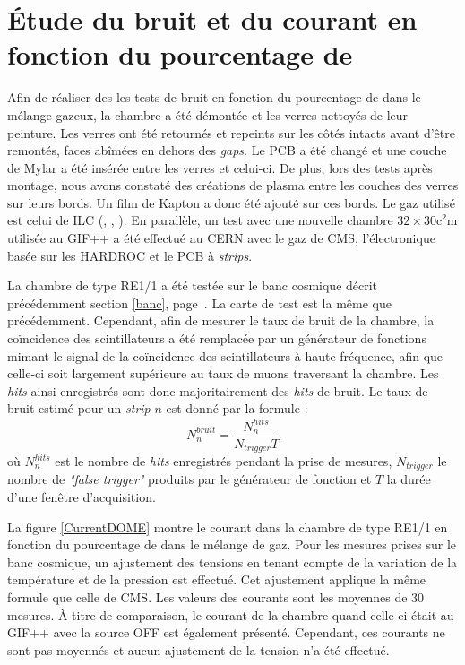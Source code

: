  \section{Étude du bruit et du courant en fonction du pourcentage de \texorpdfstring{}{SF6}}
 \label{SF66}
 Afin de réaliser des les tests de bruit en fonction du pourcentage de  dans le mélange gazeux, la chambre a été démontée et les verres nettoyés de leur peinture. Les verres ont été retournés et repeints sur les côtés intacts avant d'être remontés, faces abîmées en dehors des \textit{gaps}. Le PCB a été changé et une couche de Mylar a été insérée entre les verres et celui-ci. De plus, lors des tests après montage, nous avons constaté des créations de plasma entre les couches des verres sur leurs bords. Un film de Kapton a donc été ajouté sur ces bords. Le gaz utilisé est celui de ILC (, , ). En parallèle, un test avec une nouvelle chambre $\num{32}\times\num{30} \si{\square\centi\meter}$ utilisée au GIF++ a été effectué au CERN avec le gaz de CMS, l'électronique basée sur les HARDROC et le PCB à \textit{strips}.
 
 La chambre de type RE1/1 a été testée sur le banc cosmique décrit précédemment section \ref{banc}, page~\pageref{banc}. La carte de test est la même que précédemment. Cependant, afin de mesurer le taux de bruit de la chambre, la coïncidence des scintillateurs a été remplacée par un générateur de fonctions mimant le signal de la coïncidence des scintillateurs à haute fréquence, afin que celle-ci soit largement supérieure au taux de muons traversant la chambre. Les \textit{hits} ainsi enregistrés sont donc majoritairement des \textit{hits} de bruit. Le taux de bruit estimé pour un \textit{strip} $n$ est donné par la formule :
 \begin{equation}
 N_n^{bruit}=\frac{N_n^{hits}}{N_{trigger}T}
 \end{equation}
 où $N_n^{hits}$ est le nombre de \textit{hits} enregistrés pendant la prise de mesures, $N_{trigger}$ le nombre de \textit{"false trigger"} produits par le générateur de fonction et $T$ la durée d'une fenêtre d'acquisition.
 
 La figure \ref{CurrentDOME} montre le courant dans la chambre de type RE1/1 en fonction du pourcentage de  dans le mélange de gaz. Pour les mesures prises sur le banc cosmique, un ajustement des tensions en tenant compte de la variation de la température et de la pression est effectué. Cet ajustement applique la même formule que celle de CMS. Les valeurs des courants sont les moyennes de \num{30} mesures. À titre de comparaison, le courant de la chambre quand celle-ci était au GIF++ avec la source OFF est également présenté. Cependant, ces courants ne sont pas moyennés et aucun ajustement de la tension n'a été effectué.
 
